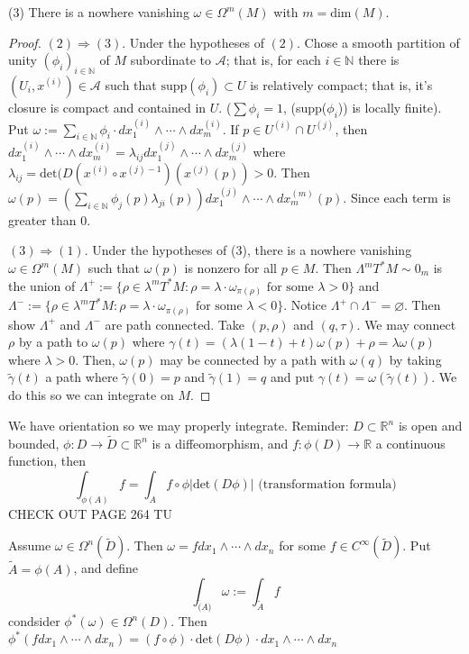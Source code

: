 \documentclass{article}
\begin{document}
(3) There is a nowhere vanishing $\omega \in \Omega^m(M)$ with $m = \text{dim}(M)$.
\begin{proof}
$(2) \Rightarrow (3)$.  Under the hypotheses of $(2)$. Chose a smooth partition of unity $(\phi_i)_{i \in \mathbb{N}}$ of $M$ subordinate to $\mathscr{A}$; that is, for each $i \in \mathbb{N}$ there is $(U_i, x^{(i)}) \in \mathscr{A}$ such that $\text{supp}(\phi_i) \subset U$ is relatively compact; that is, it's closure is compact and contained in $U$. ($\sum \phi_i = 1$, (supp($\phi_i$)) is locally finite). Put $\omega := \sum_{i \in \mathbb{N}} \phi_i \cdot dx_1^{(i)} \wedge \cdots \wedge dx_m^{(i)}$. If $p \in U^{(i)} \cap U^{(j)}$, then $dx_1^{(i)} \wedge \cdots \wedge dx_m^{(i)} = \lambda_{ij}dx_1^{(j)}\wedge \cdots \wedge dx_m^{(j)}$ where $\lambda_{ij} = \text{det}(D(x^{(i)} \circ x^{(j)-1}) (x^{(j)}(p)) > 0$. Then $\omega(p) = (\sum_{i \in \mathbb{N}} \phi_j(p) \lambda_{ji}(p))dx_1^{(j)}\wedge \cdots \wedge dx_m^{(m)}(p)$. Since each term is greater than $0$.

$(3) \Rightarrow (1)$. Under the hypotheses of (3), there is a nowhere vanishing $\omega \in \Omega^m(M)$ such that $\omega(p)$ is nonzero for all $p \in M$. Then $\Lambda^mT^*M \sim 0_m$ is the union of $\Lambda^+ := \{ \rho \in \lambda^m T^*M : \rho = \lambda \cdot \omega_{\pi(\rho)} \text{ for some } \lambda > 0 \}$ and $\Lambda^- := \{ \rho \in \lambda^m T^*M : \rho = \lambda \cdot \omega_{\pi(\rho)} \text{ for some } \lambda < 0 \}$. Notice $\Lambda^+ \cap \Lambda^- = \varnothing$. Then show $\Lambda^+$ and $\Lambda^-$ are path connected. Take $(p, \rho)$ and $(q, \tau)$. We may connect $\rho$ by a path to $\omega(p)$ where $\gamma(t) = (\lambda(1-t) + t)\omega(p) + \rho = \lambda\omega(p)$ where $\lambda > 0$. Then, $\omega(p)$ may be connected by a path with $\omega(q)$ by taking $\tilde{\gamma}(t)$ a path where $\tilde{\gamma}(0) = p$ and $\tilde{\gamma}(1) = q$ and put $\gamma(t) = \omega(\tilde{\gamma}(t))$. We do this so we can integrate on $M$.

\end{proof}

We have orientation so we may properly integrate. Reminder: $D \subset \mathbb{R}^n$ is open and bounded, $\phi: D \to \tilde{D} \subset \mathbb{R}^n$ is a diffeomorphism, and $f: \phi(D) \to \mathbb{R}$ a continuous function, then
\[
\int_{\phi(A)}f = \int_{A}f \circ \phi |\text{det}(D\phi)| \text{ (transformation formula)}
\]  
CHECK OUT PAGE 264 TU

Assume $\omega \in \Omega^n(\tilde{D})$. Then $\omega = f dx_1 \wedge \cdots \wedge dx_n$ for some $f \in C^\infty(\tilde{D})$. Put $\tilde{A} = \phi(A)$, and define
\[
\int_{\tilde(A)}\omega := \int_{\tilde{A}}f
\]
condsider $\phi^*(\omega) \in \Omega^n(D)$. Then $\phi^*(f dx_1 \wedge \cdots \wedge dx_n) = (f \circ \phi)\cdot \text{det}(D\phi) \cdot dx_1 \wedge \cdots \wedge dx_n$ 
\end{document}
